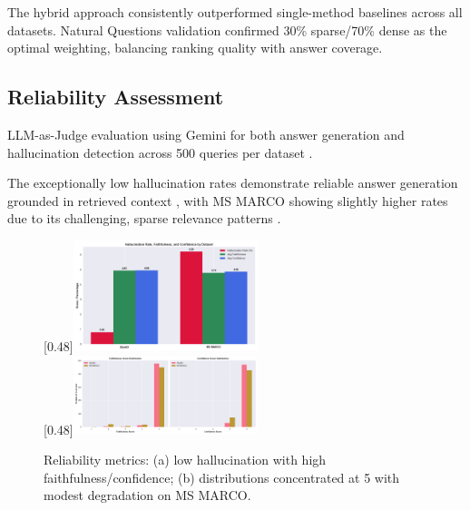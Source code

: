 \documentclass[11pt]{article}
\begin{document}
The hybrid approach consistently outperformed single-method baselines across all datasets. Natural Questions validation confirmed 30\% sparse/70\% dense as the optimal weighting, balancing ranking quality with answer coverage.

\subsection{Reliability Assessment}

LLM-as-Judge evaluation using Gemini for both answer generation and hallucination detection across 500 queries per dataset \cite{llm_judge,hallucination_survey}.

\begin{table}[hb]
\centering
\caption{Hallucination metrics (n=500 judged queries per dataset). Natural Questions pending.}
\label{tab:hallucination}
\begingroup
\setlength{\tabcolsep}{3pt}
\small
{}%
\endgroup
\end{table}

The exceptionally low hallucination rates demonstrate reliable answer generation grounded in retrieved context \cite{hallucination_survey}, with MS MARCO showing slightly higher rates due to its challenging, sparse relevance patterns \cite{msmarco}.

\begin{figure}[!t]
\centering
\begingroup
\captionsetup{font=small}
[0.48\textwidth]{\includegraphics[width=0.48\textwidth]{images/evaluation_images/hallucination_score.png}}\\[4pt]
[0.48\textwidth]{\includegraphics[width=0.48\textwidth]{images/evaluation_images/confidence_score.png}}
\caption{Reliability metrics: (a) low hallucination with high faithfulness/confidence; (b) distributions concentrated at 5 with modest degradation on MS MARCO.}
\label{fig:reliability_overview}
\endgroup
\end{figure}
\end{document}
